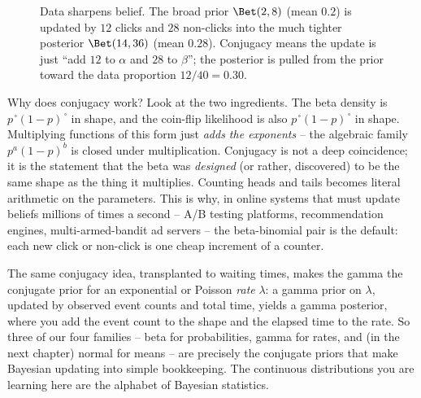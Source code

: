 \begin{figure}[H]
\centering
{}
\caption{Data sharpens belief. The broad prior $\Bet(2,8)$ (mean $0.2$) is updated
by $12$ clicks and $28$ non-clicks into the much tighter posterior
$\Bet(14,36)$ (mean $0.28$). Conjugacy means the update is just ``add $12$ to
$\alpha$ and $28$ to $\beta$''; the posterior is pulled from the prior toward the
data proportion $12/40=0.30$.}
\label{ch11:fig-beta-update}
\end{figure}

\begin{happeningbox}
Why does conjugacy work? Look at the two ingredients. The beta density is
$p^{\,\square}(1-p)^{\,\square}$ in shape, and the coin-flip likelihood is also
$p^{\,\square}(1-p)^{\,\square}$ in shape. Multiplying functions of this form
just \emph{adds the exponents} -- the algebraic family $p^a(1-p)^b$ is closed
under multiplication. Conjugacy is not a deep coincidence; it is the statement
that the beta was \emph{designed} (or rather, discovered) to be the same shape as
the thing it multiplies. Counting heads and tails becomes literal arithmetic on
the parameters. This is why, in online systems that must update beliefs millions
of times a second -- A/B testing platforms, recommendation engines,
multi-armed-bandit ad servers -- the beta-binomial pair is the default: each new
click or non-click is one cheap increment of a counter.
\end{happeningbox}

\begin{connectionbox}
The same conjugacy idea, transplanted to waiting times, makes the gamma the
conjugate prior for an exponential or Poisson \emph{rate} $\lambda$: a gamma
prior on $\lambda$, updated by observed event counts and total time, yields a
gamma posterior, where you add the event count to the shape and the elapsed time
to the rate. So three of our four families -- beta for probabilities, gamma for
rates, and (in the next chapter) normal for means -- are precisely the
conjugate priors that make Bayesian updating into simple bookkeeping. The
continuous distributions you are learning here are the alphabet of Bayesian
statistics.
\end{connectionbox}

